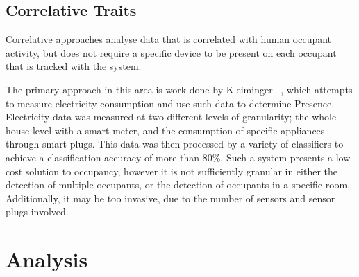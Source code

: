 \documentclass[../thesis/thesis.tex]{subfiles}
\begin{document}
\subsection{Correlative Traits}
\label{subsubsec:litreview:sensors:extrinsic:correlative}
Correlative approaches analyse data that is correlated with human occupant activity, but does not require a specific device to be present on each occupant that is tracked with the system.

The primary approach in this area is work done by Kleiminger \etal~\cite{kleiminger2013occupancy}, which attempts to measure electricity consumption and use such data to determine Presence. Electricity data was measured at two different levels of granularity; the whole house level with a smart meter, and the consumption of specific appliances through smart plugs. This data was then processed by a variety of classifiers to achieve a classification accuracy of more than 80\%. Such a system presents a low-cost solution to occupancy, however it is not sufficiently granular in either the detection of multiple occupants, or the detection of occupants in a specific room. Additionally, it may be too invasive, due to the number of sensors and sensor plugs involved.

\section{Analysis}
\label{sec:litreview:sensors:analysis}
\end{document}
